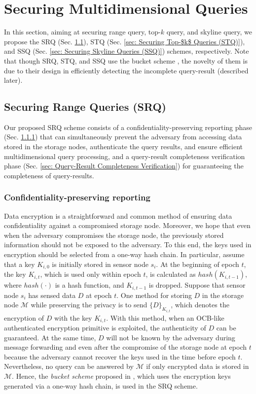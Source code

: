 \documentclass[conference]{IEEEtran}
\begin{document}
\section{Securing Multidimensional Queries}\label{sec: Securing Multidimensional Queries}
In this section, aiming at securing range query, top-$k$ query, and skyline query, we propose the SRQ (Sec. \ref{sec: Securing Range Queries (SRQ)}), STQ (Sec. \ref{sec: Securing Top-$k$ Queries (STQ)}), and SSQ (Sec. \ref{sec: Securing Skyline Queries (SSQ)}) schemes, respectively. Note that though SRQ, STQ, and SSQ use the bucket scheme \cite{hilm02,hmt04}, the novelty of them is due to their design in efficiently detecting the incomplete query-result (described later).

\subsection{Securing Range Queries (SRQ)}\label{sec: Securing Range Queries (SRQ)}
Our proposed SRQ scheme consists of a confidentiality-preserving reporting phase (Sec. \ref{sec: Confidentiality-preserving reporting}) that can simultaneously prevent the adversary from accessing data stored in the storage nodes, authenticate the query results, and ensure efficient multidimensional query processing, and a query-result completeness verification phase (Sec. \ref{sec: Query-Result Completeness Verification}) for guaranteeing the completeness of query-results.

\subsubsection{Confidentiality-preserving reporting}\label{sec: Confidentiality-preserving reporting}
Data encryption is a straightforward and common method of ensuring data confidentiality against a compromised storage node. Moreover, we hope that even when the adversary compromises the storage node, the previously stored information should not be exposed to the adversary. To this end, the keys used in encryption should be selected from a one-way hash chain. In particular, assume that a key $K_{i,0}$ is initially stored in sensor node $s_i$. At the beginning of epoch $t$, the key $K_{i,t}$, which is used only within epoch $t$, is calculated as $hash(K_{i,t-1})$, where $hash(\cdot)$ is a hash function, and $K_{i,t-1}$ is dropped. Suppose that sensor node $s_i$ has sensed data $D$ at epoch $t$. One method for storing $D$ in the storage node $\mathcal{M}$ while preserving the privacy is to send $\{D\}_{K_{i,t}}$, which denotes the encryption of $D$ with the key $K_{i,t}$. With this method, when an OCB-like authenticated encryption primitive \cite{rbb03} is exploited, the authenticity of $D$ can be guaranteed. At the same time, $D$ will not be known by the adversary during message forwarding and even after the compromise of the storage node at epoch $t$ because the adversary cannot recover the keys used in the time before epoch $t$. Nevertheless, no query can be answered by $\mathcal{M}$ if only encrypted data is stored in $\mathcal{M}$. Hence, the \emph{bucket scheme} proposed in \cite{hilm02,hmt04}, which uses the encryption keys generated via a one-way hash chain, is used in the SRQ scheme.
\end{document}
